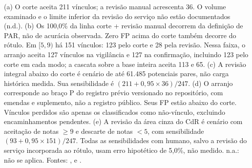 \begin{table}[!ht]
\parbox{\linewidth}{\footnotesize (a) O corte aceita 211 vínculos; a revisão manual acrescenta 36. O volume examinado e o limite inferior da revisão do serviço não estão documentados (n.d.). (b) Os 100,0\% da linha corte + revisão manual decorrem da definição de PAR, não de acurácia observada. Zero FP acima do corte também decorre do rótulo. Em $[5,9)$ há 151 vínculos: 123 pelo corte e 28 pela revisão. Nessa faixa, o arranjo aceita 127 vínculos na vigilância e 127 na confirmação, incluindo 123 pelo corte em cada modo; a cascata sobre a base inteira aceita 113 e 65. (c) A revisão integral abaixo do corte é cenário de até 61.485 potenciais pares, não carga histórica medida. Sua sensibilidade é $(211+0{,}95\times36)/247$. (d) O arranjo corresponde ao braço P do registro prévio versionado no repositório, com emendas e suplemento, não a registro público. Seus FP estão abaixo do corte. Vínculos perdidos são apenas os classificados como não-vínculo, excluindo encaminhamentos pendentes. (e) A revisão da área cinza do CdR é cenário com aceitação de notas $\geq9$ e descarte de notas $<5$, com sensibilidade $(93+0{,}95\times151)/247$. Todas as sensibilidades com humano, salvo a revisão do serviço incorporada ao rótulo, usam erro hipotético de 5,0\%, não medido. n.a.: não se aplica. Fontes: ,  e  \cite{Jardim2026phdrepo}.
}
\end{table}
